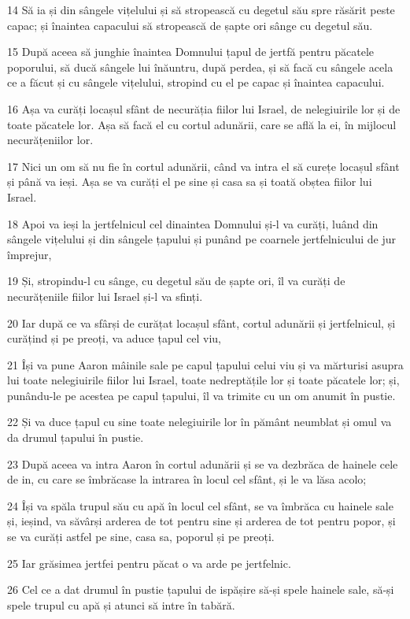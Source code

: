 \par 14 Să ia și din sângele vițelului și să stropească cu degetul său spre răsărit peste capac; și înaintea capacului să stropească de șapte ori sânge cu degetul său.
\par 15 După aceea să junghie înaintea Domnului țapul de jertfă pentru păcatele poporului, să ducă sângele lui înăuntru, după perdea, și să facă cu sângele acela ce a făcut și cu sângele vițelului, stropind cu el pe capac și înaintea capacului.
\par 16 Așa va curăți locașul sfânt de necurăția fiilor lui Israel, de nelegiuirile lor și de toate păcatele lor. Așa să facă el cu cortul adunării, care se află la ei, în mijlocul necurățeniilor lor.
\par 17 Nici un om să nu fie în cortul adunării, când va intra el să curețe locașul sfânt și până va ieși. Așa se va curăți el pe sine și casa sa și toată obștea fiilor lui Israel.
\par 18 Apoi va ieși la jertfelnicul cel dinaintea Domnului și-l va curăți, luând din sângele vițelului și din sângele țapului și punând pe coarnele jertfelnicului de jur împrejur,
\par 19 Și, stropindu-l cu sânge, cu degetul său de șapte ori, îl va curăți de necurățeniile fiilor lui Israel și-l va sfinți.
\par 20 Iar după ce va sfârși de curățat locașul sfânt, cortul adunării și jertfelnicul, și curățind și pe preoți, va aduce țapul cel viu,
\par 21 Își va pune Aaron mâinile sale pe capul țapului celui viu și va mărturisi asupra lui toate nelegiuirile fiilor lui Israel, toate nedreptățile lor și toate păcatele lor; și, punându-le pe acestea pe capul țapului, îl va trimite cu un om anumit în pustie.
\par 22 Și va duce țapul cu sine toate nelegiuirile lor în pământ neumblat și omul va da drumul țapului în pustie.
\par 23 După aceea va intra Aaron în cortul adunării și se va dezbrăca de hainele cele de in, cu care se îmbrăcase la intrarea în locul cel sfânt, și le va lăsa acolo;
\par 24 Își va spăla trupul său cu apă în locul cel sfânt, se va îmbrăca cu hainele sale și, ieșind, va săvârși arderea de tot pentru sine și arderea de tot pentru popor, și se va curăți astfel pe sine, casa sa, poporul și pe preoți.
\par 25 Iar grăsimea jertfei pentru păcat o va arde pe jertfelnic.
\par 26 Cel ce a dat drumul în pustie țapului de ispășire să-și spele hainele sale, să-și spele trupul cu apă și atunci să intre în tabără.
